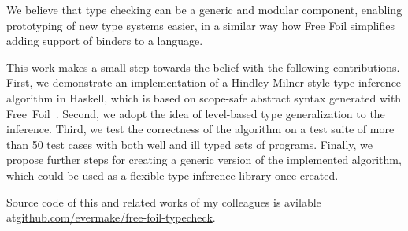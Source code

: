 We believe that type checking can be a generic and modular component, enabling prototyping of new type systems easier, in a similar way how Free Foil simplifies adding support of binders to a language.

This work makes a small step towards the belief with the following contributions. First, we demonstrate an implementation of a Hindley-Milner-style type inference algorithm in Haskell, which is based on scope-safe abstract syntax generated with Free~Foil~\cite{FreeFoil}. Second, we adopt the idea of level-based type generalization to the inference. Third, we test the correctness of the algorithm on a test suite of more than 50 test cases with both well and ill typed sets of programs. Finally, we propose further steps for creating a generic version of the implemented algorithm, which could be used as a flexible type inference library once created.

Source code of this and related works of my colleagues is avilable at\newline \href{https://github.com/evermake/free-foil-typecheck}{github.com/evermake/free-foil-typecheck}.
